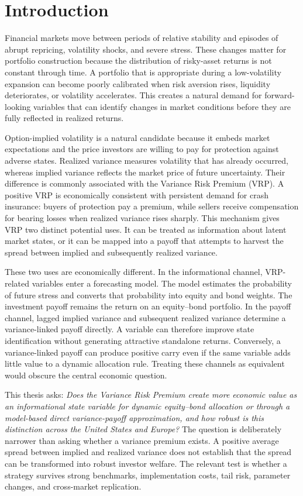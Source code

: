 \section{Introduction}
\label{sec:introduction}

Financial markets move between periods of relative stability and episodes of abrupt repricing, volatility shocks, and severe stress. These changes matter for portfolio construction because the distribution of risky-asset returns is not constant through time. A portfolio that is appropriate during a low-volatility expansion can become poorly calibrated when risk aversion rises, liquidity deteriorates, or volatility accelerates. This creates a natural demand for forward-looking variables that can identify changes in market conditions before they are fully reflected in realized returns.

Option-implied volatility is a natural candidate because it embeds market expectations and the price investors are willing to pay for protection against adverse states. Realized variance measures volatility that has already occurred, whereas implied variance reflects the market price of future uncertainty. Their difference is commonly associated with the Variance Risk Premium (VRP). A positive VRP is economically consistent with persistent demand for crash insurance: buyers of protection pay a premium, while sellers receive compensation for bearing losses when realized variance rises sharply. This mechanism gives VRP two distinct potential uses. It can be treated as information about latent market states, or it can be mapped into a payoff that attempts to harvest the spread between implied and subsequently realized variance.

These two uses are economically different. In the informational channel, VRP-related variables enter a forecasting model. The model estimates the probability of future stress and converts that probability into equity and bond weights. The investment payoff remains the return on an equity--bond portfolio. In the payoff channel, lagged implied variance and subsequent realized variance determine a variance-linked payoff directly. A variable can therefore improve state identification without generating attractive standalone returns. Conversely, a variance-linked payoff can produce positive carry even if the same variable adds little value to a dynamic allocation rule. Treating these channels as equivalent would obscure the central economic question.

This thesis asks: \emph{Does the Variance Risk Premium create more economic value as an informational state variable for dynamic equity--bond allocation or through a model-based direct variance-payoff approximation, and how robust is this distinction across the United States and Europe?} The question is deliberately narrower than asking whether a variance premium exists. A positive average spread between implied and realized variance does not establish that the spread can be transformed into robust investor welfare. The relevant test is whether a strategy survives strong benchmarks, implementation costs, tail risk, parameter changes, and cross-market replication.


